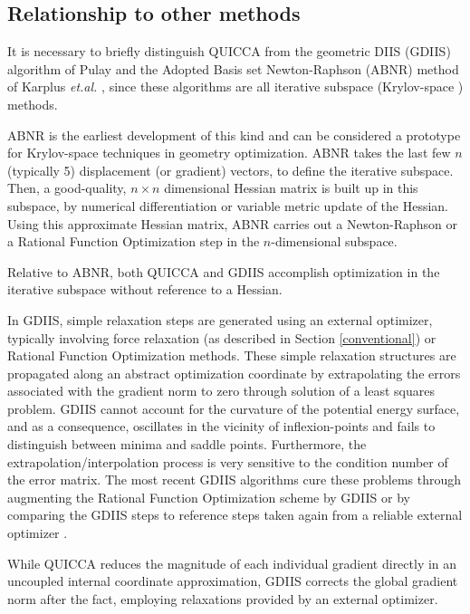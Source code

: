 \documentclass[prl,aps,preprint,superbib,12pt]{revtex4}
\begin{document}
\subsection{Relationship to other methods}
It is necessary to briefly distinguish QUICCA from the 
geometric DIIS (GDIIS) \cite{PPulay84} algorithm of Pulay and 
the Adopted Basis set Newton-Raphson (ABNR) method of Karplus 
{\it et.al.} \cite{BBrooks83}, since these algorithms are all iterative
subspace (Krylov-space \cite{YSaad92}) methods.

ABNR is the earliest development of this kind and can be considered
a prototype for Krylov-space techniques in geometry optimization.
ABNR takes the last few $n$ (typically 5) 
displacement (or gradient) vectors, to define
the iterative subspace. Then, a good-quality, 
$n\times n$ dimensional Hessian matrix is built up in this
subspace, by numerical differentiation or variable metric update
of the Hessian.
Using this approximate Hessian matrix,
ABNR carries out a Newton-Raphson or a Rational Function Optimization 
\cite{ABanerji85} step in the $n$-dimensional subspace. 

Relative to ABNR, both QUICCA and GDIIS accomplish optimization in the iterative
subspace without reference to a Hessian. 

In GDIIS, simple relaxation steps are generated using an external optimizer,
typically involving force relaxation (as described in Section \ref{conventional}) or 
Rational Function Optimization methods.  These
simple relaxation structures are propagated along an abstract optimization
coordinate by extrapolating the errors associated with the
gradient norm to zero through solution of a least squares problem.
GDIIS cannot account for the curvature of the potential
energy surface, and as a consequence,  oscillates in the vicinity of inflexion-points and fails to
distinguish between minima and saddle points. Furthermore, the extrapolation/interpolation
process is very sensitive to the condition number of the error matrix. The most recent GDIIS algorithms
cure these problems through augmenting the Rational Function Optimization scheme by GDIIS
\cite{FEckert97} or by comparing the GDIIS steps to reference steps
taken again from a reliable external optimizer \cite{OFarkas02}.

While QUICCA reduces the magnitude of each individual gradient directly in an uncoupled internal 
coordinate approximation, GDIIS corrects the global gradient norm after the fact, employing relaxations 
provided by an external optimizer.  
\end{document}
